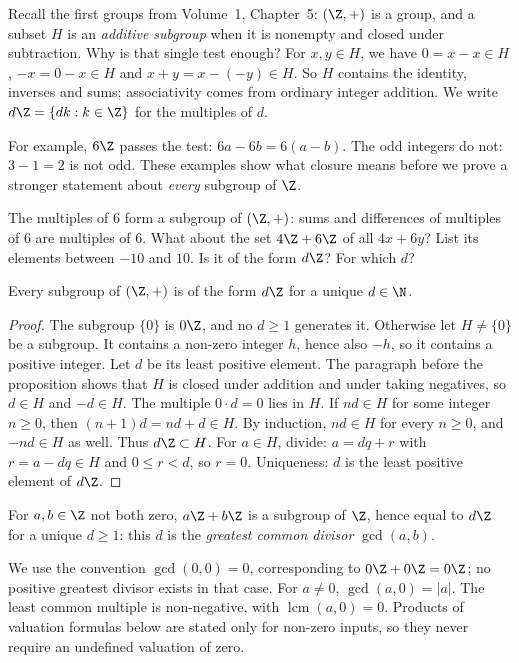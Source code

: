 Recall the first groups from Volume~1, Chapter~5: $(\Z,+)$ is a group, and a subset $H$ is an \emph{additive subgroup} when it is nonempty and closed under subtraction. Why is that single test enough? For $x,y\in H$, we have $0=x-x\in H$, $-x=0-x\in H$ and $x+y=x-(-y)\in H$. So $H$ contains the identity, inverses and sums; associativity comes from ordinary integer addition. We write $d\Z=\{dk:k\in\Z\}$ for the multiples of $d$.

For example, $6\Z$ passes the test: $6a-6b=6(a-b)$. The odd integers do not: $3-1=2$ is not odd. These examples show what closure means before we prove a stronger statement about \emph{every} subgroup of $\Z$.

\begin{think}
The multiples of $6$ form a subgroup of $(\Z,+)$: sums and differences of multiples of $6$ are multiples of $6$. What about the set $4\Z+6\Z$ of all $4x+6y$? List its elements between $-10$ and $10$. Is it of the form $d\Z$? For which $d$?
\end{think}

\begin{proposition}\label{prop:subgroups}
Every subgroup of $(\Z,+)$ is of the form $d\Z$ for a unique $d\in\N$.
\end{proposition}
\begin{proof}
The subgroup $\{0\}$ is $0\Z$, and no $d\ge1$ generates it. Otherwise let $H\ne\{0\}$ be a subgroup. It contains a non-zero integer $h$, hence also $-h$, so it contains a positive integer. Let $d$ be its least positive element. The paragraph before the proposition shows that $H$ is closed under addition and under taking negatives, so $d\in H$ and $-d\in H$. The multiple $0\cdot d=0$ lies in $H$. If $nd\in H$ for some integer $n\ge0$, then $(n+1)d=nd+d\in H$. By induction, $nd\in H$ for every $n\ge0$, and $-nd\in H$ as well. Thus $d\Z\subset H$. For $a\in H$, divide: $a=dq+r$ with $r=a-dq\in H$ and $0\le r<d$, so $r=0$. Uniqueness: $d$ is the least positive element of $d\Z$.
\end{proof}

\begin{definition}
For $a,b\in\Z$ not both zero, $a\Z+b\Z$ is a subgroup of $\Z$, hence equal to $d\Z$ for a unique $d\ge1$: this $d$ is the \emph{greatest common divisor} $\gcd(a,b)$.\label{sym:gcd}
\end{definition}

We use the convention $\gcd(0,0)=0$, corresponding to
$0\Z+0\Z=0\Z$; no positive greatest divisor exists in that case.
For $a\ne0$, $\gcd(a,0)=|a|$. The least common multiple is non-negative,
with $\operatorname{lcm}(a,0)=0$. Products of valuation formulas below
are stated only for non-zero inputs, so they never require an undefined
valuation of zero.

